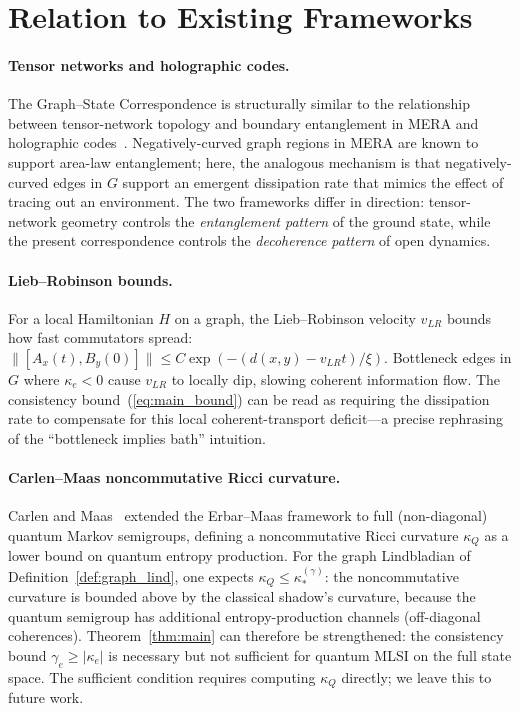 \documentclass[11pt,letterpaper]{article}
\theoremstyle{definition}
\theoremstyle{remark}
\begin{document}
\section{Relation to Existing Frameworks}
\label{sec:relations}

\paragraph{Tensor networks and holographic codes.}
The Graph--State Correspondence is structurally similar to the relationship
between tensor-network topology and boundary entanglement in
MERA and holographic codes~\cite{Evenbly2011,Pastawski2015}.
Negatively-curved graph regions in MERA are known to support area-law
entanglement; here, the analogous mechanism is that negatively-curved edges
in $G$ support an emergent dissipation rate that mimics the effect of
tracing out an environment. The two frameworks differ in direction:
tensor-network geometry controls the \emph{entanglement pattern} of the
ground state, while the present correspondence controls the
\emph{decoherence pattern} of open dynamics.

\paragraph{Lieb--Robinson bounds.}
For a local Hamiltonian $H$ on a graph, the Lieb--Robinson velocity $v_{LR}$
bounds how fast commutators spread: $\|[A_x(t), B_y(0)]\|
\le C \exp(-(d(x,y) - v_{LR} t)/\xi)$. Bottleneck edges in $G$ where
$\kappa_e < 0$ cause $v_{LR}$ to locally dip, slowing coherent information
flow. The consistency bound~(\ref{eq:main_bound}) can be read as requiring
the dissipation rate to compensate for this local coherent-transport
deficit---a precise rephrasing of the ``bottleneck implies bath'' intuition.

\paragraph{Carlen--Maas noncommutative Ricci curvature.}
Carlen and Maas~\cite{CarlenMaas2017} extended the Erbar--Maas framework to
full (non-diagonal) quantum Markov semigroups, defining a noncommutative
Ricci curvature $\kappa_Q$ as a lower bound on quantum entropy production.
For the graph Lindbladian of Definition~\ref{def:graph_lind}, one expects
$\kappa_Q \le \kappa_{*}^{(\gamma)}$: the noncommutative curvature is bounded
above by the classical shadow's curvature, because the quantum semigroup
has additional entropy-production channels (off-diagonal coherences).
Theorem~\ref{thm:main} can therefore be strengthened: the consistency bound
$\gamma_e \ge |\kappa_e|$ is necessary but not sufficient for quantum MLSI
on the full state space. The sufficient condition requires computing
$\kappa_Q$ directly; we leave this to future work.
\end{document}

